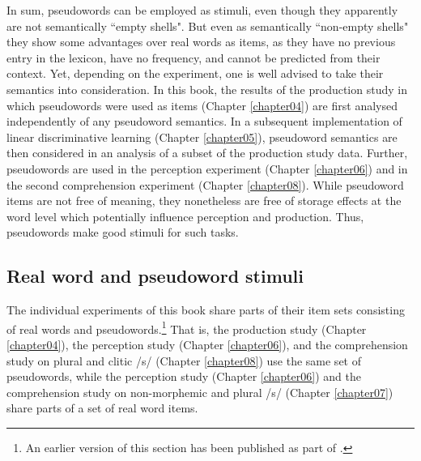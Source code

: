 In sum, pseudowords can be employed as stimuli, even though they apparently are not semantically ``empty shells". But even as semantically ``non-empty shells" they show some advantages over real words as items, as they have no previous entry in the lexicon, have no frequency, and cannot be predicted from their context. Yet, depending on the experiment, one is well advised to take their semantics into consideration. In this book, the results of the production study in which pseudowords were used as items (Chapter \ref{chapter04}) are first analysed independently of any pseudoword semantics. In a subsequent implementation of linear discriminative learning (Chapter \ref{chapter05}), pseudoword semantics are then considered in an analysis of a subset of the production study data. Further, pseudowords are used in the perception experiment (Chapter \ref{chapter06}) and in the second comprehension experiment (Chapter \ref{chapter08}). While pseudoword items are not free of meaning, they nonetheless are free of storage effects at the word level which potentially influence perception and production. Thus, pseudowords make good stimuli for such tasks.

\subsection{Real word and pseudoword stimuli}\label{section03_1_2}

The individual experiments of this book share parts of their item sets consisting of real words and pseudowords.\footnote{An earlier version of this section has been published as part of \citet{Schmitz2021a}.} That is, the production study (Chapter \ref{chapter04}), the perception study (Chapter \ref{chapter06}), and the comprehension study on plural and clitic /s/ (Chapter \ref{chapter08}) use the same set of pseudowords, while the perception study (Chapter \ref{chapter06}) and the comprehension study on non-morphemic and plural /s/ (Chapter \ref{chapter07}) share parts of a set of real word items.

